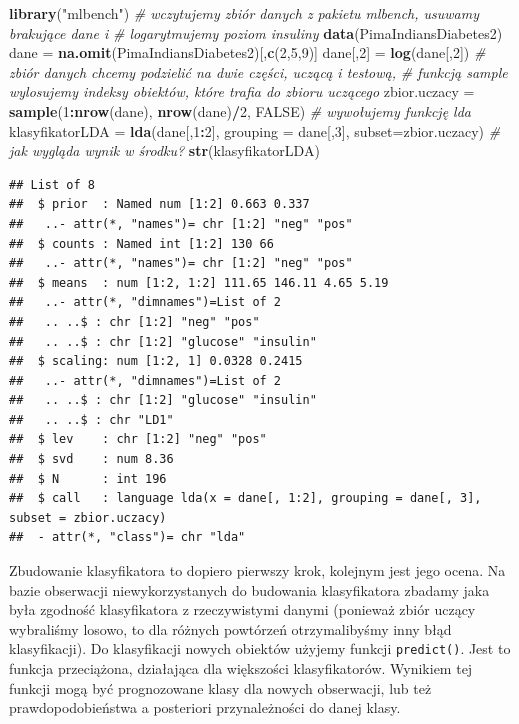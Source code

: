 \documentclass[polish,]{book}
\newenvironment{Shaded}{\begin{snugshade}}{\end{snugshade}}
\newcommand{\CommentTok}[1]{\textcolor[rgb]{0.56,0.35,0.01}{\textit{#1}}}
\newcommand{\DataTypeTok}[1]{\textcolor[rgb]{0.13,0.29,0.53}{#1}}
\newcommand{\DecValTok}[1]{\textcolor[rgb]{0.00,0.00,0.81}{#1}}
\newcommand{\KeywordTok}[1]{\textcolor[rgb]{0.13,0.29,0.53}{\textbf{#1}}}
\newcommand{\NormalTok}[1]{#1}
\newcommand{\OperatorTok}[1]{\textcolor[rgb]{0.81,0.36,0.00}{\textbf{#1}}}
\newcommand{\OtherTok}[1]{\textcolor[rgb]{0.56,0.35,0.01}{#1}}
\newcommand{\StringTok}[1]{\textcolor[rgb]{0.31,0.60,0.02}{#1}}
\begin{document}
\begin{Shaded}
\begin{Highlighting}[]
\KeywordTok{library}\NormalTok{(}\StringTok{"mlbench"}\NormalTok{)}
\CommentTok{# wczytujemy zbiór danych z pakietu mlbench, usuwamy brakujące dane i}
\CommentTok{# logarytmujemy poziom insuliny}
\KeywordTok{data}\NormalTok{(PimaIndiansDiabetes2)}
\NormalTok{dane =}\StringTok{ }\KeywordTok{na.omit}\NormalTok{(PimaIndiansDiabetes2)[,}\KeywordTok{c}\NormalTok{(}\DecValTok{2}\NormalTok{,}\DecValTok{5}\NormalTok{,}\DecValTok{9}\NormalTok{)]}
\NormalTok{dane[,}\DecValTok{2}\NormalTok{] =}\StringTok{ }\KeywordTok{log}\NormalTok{(dane[,}\DecValTok{2}\NormalTok{])}
\CommentTok{# zbiór danych chcemy podzielić na dwie części, uczącą i testową,}
\CommentTok{# funkcją sample wylosujemy indeksy obiektów, które trafia do zbioru uczącego}
\NormalTok{zbior.uczacy =}\StringTok{ }\KeywordTok{sample}\NormalTok{(}\DecValTok{1}\OperatorTok{:}\KeywordTok{nrow}\NormalTok{(dane), }\KeywordTok{nrow}\NormalTok{(dane)}\OperatorTok{/}\DecValTok{2}\NormalTok{, }\OtherTok{FALSE}\NormalTok{)}
\CommentTok{# wywołujemy funkcję lda}
\NormalTok{klasyfikatorLDA =}\StringTok{ }\KeywordTok{lda}\NormalTok{(dane[,}\DecValTok{1}\OperatorTok{:}\DecValTok{2}\NormalTok{], }\DataTypeTok{grouping =}\NormalTok{ dane[,}\DecValTok{3}\NormalTok{], }\DataTypeTok{subset=}\NormalTok{zbior.uczacy)}
\CommentTok{# jak wygląda wynik w środku?}
\KeywordTok{str}\NormalTok{(klasyfikatorLDA)}
\end{Highlighting}
\end{Shaded}

\begin{verbatim}
## List of 8
##  $ prior  : Named num [1:2] 0.663 0.337
##   ..- attr(*, "names")= chr [1:2] "neg" "pos"
##  $ counts : Named int [1:2] 130 66
##   ..- attr(*, "names")= chr [1:2] "neg" "pos"
##  $ means  : num [1:2, 1:2] 111.65 146.11 4.65 5.19
##   ..- attr(*, "dimnames")=List of 2
##   .. ..$ : chr [1:2] "neg" "pos"
##   .. ..$ : chr [1:2] "glucose" "insulin"
##  $ scaling: num [1:2, 1] 0.0328 0.2415
##   ..- attr(*, "dimnames")=List of 2
##   .. ..$ : chr [1:2] "glucose" "insulin"
##   .. ..$ : chr "LD1"
##  $ lev    : chr [1:2] "neg" "pos"
##  $ svd    : num 8.36
##  $ N      : int 196
##  $ call   : language lda(x = dane[, 1:2], grouping = dane[, 3], subset = zbior.uczacy)
##  - attr(*, "class")= chr "lda"
\end{verbatim}

Zbudowanie klasyfikatora to dopiero pierwszy krok, kolejnym jest jego ocena.
Na bazie obserwacji niewykorzystanych do budowania klasyfikatora zbadamy jaka
była zgodność klasyfikatora z rzeczywistymi danymi (ponieważ zbiór uczący wybraliśmy losowo, to dla różnych powtórzeń otrzymalibyśmy inny błąd klasyfikacji).
Do klasyfikacji nowych obiektów użyjemy funkcji \texttt{predict()}. Jest to funkcja przeciążona, działająca dla większości klasyfikatorów. Wynikiem tej funkcji mogą być
prognozowane klasy dla nowych obserwacji, lub też prawdopodobieństwa a posteriori przynależności do danej klasy.
\end{document}
